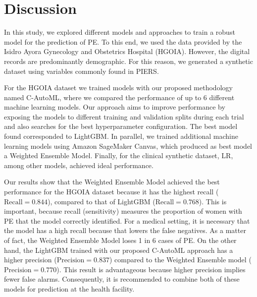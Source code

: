 \documentclass[diagnostics,article,submit,pdftex,moreauthors]{Definitions/mdpi}
\begin{document}
\newpage
\section{Discussion}
\label{sec:discussion}

In this study, we explored different models and approaches to train a
robust model for the prediction of \ac{PE}. To this end, we
used the data provided by the Isidro Ayora Gynecology and Obstetrics
Hospital (\ac{HGOIA}). However, the digital records are predominantly
demographic. For this reason, we generated a synthetic dataset using
variables commonly found in \ac{PIERS}.

For the \ac{HGOIA} dataset we trained models with our
proposed methodology named \ac{C-AutoML}, where we compared the
performance of up to 6 different machine learning models. Our approach
aims to improve performance by exposing the models to different
training and validation splits during each trial and also searches
for the best hyperparameter configuration. The best model found corresponded
to LightGBM. In parallel, we trained additional
machine learning models using Amazon SageMaker Canvas, which produced as
best model a Weighted Ensemble Model. Finally, for the
clinical synthetic dataset, \ac{LR}, among other models, achieved
ideal performance.

Our results show that the Weighted Ensemble Model achieved
the best performance for the \ac{HGOIA} dataset because it
has the highest recall ($\mathrm{Recall}=0.844$), compared to that of
LightGBM ($\mathrm{Recall}=0.768$). This is important,
because recall (sensitivity) measures the proportion of women with
\ac{PE} that the model correctly identified. For a medical setting, it is necessary that the model has a
high recall because that lowers the false negatives. As a matter of
fact, the Weighted Ensemble Model loses 1 in 6 cases of
\ac{PE}. On the other hand, the LightGBM trained with
our proposed \ac{C-AutoML} approach has a higher precision
($\mathrm{Precision}=0.837$) compared to the Weighted Ensemble
  model ($\mathrm{Precision}=0.770$). This result is advantageous
because higher precision implies fewer false alarms. Consequently, it is
recommended to combine both of these models for prediction at the
health facility.
\end{document}
